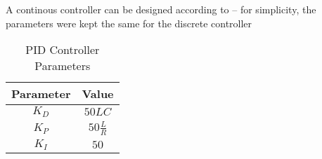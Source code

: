 A continous controller can be designed according to \autocite{samosirSimpleFormulaDesigning2023} -- for simplicity, the parameters were kept the same for the discrete controller

\begin{table}[htbp]
    \centering
    \begin{tabular}{c|c}
        Parameter & Value \\ \hline
        $K_D$ & $50 LC$ \\ 
        $K_P$ & $50 \frac{L}{R}$ \\ 
        $K_I$ & $50$ \\ 
    \end{tabular}
    \caption{PID Controller Parameters}
    \label{tab:pid_parameters}
\end{table}


